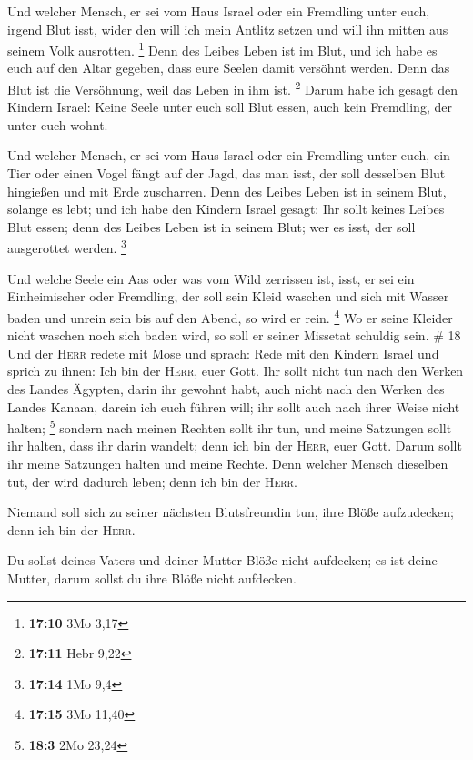  Und welcher Mensch, er sei vom Haus Israel oder ein
Fremdling unter euch, irgend Blut isst, wider den will ich mein Antlitz
setzen und will ihn mitten aus seinem Volk ausrotten. \footnote{\textbf{17:10}
  3Mo 3,17}  Denn des Leibes Leben ist im Blut, und ich
habe es euch auf den Altar gegeben, dass eure Seelen damit versöhnt
werden. Denn das Blut ist die Versöhnung, weil das Leben in ihm ist.
\footnote{\textbf{17:11} Hebr 9,22}  Darum habe ich
gesagt den Kindern Israel: Keine Seele unter euch soll Blut essen, auch
kein Fremdling, der unter euch wohnt.

 Und welcher Mensch, er sei vom Haus Israel oder ein
Fremdling unter euch, ein Tier oder einen Vogel fängt auf der Jagd, das
man isst, der soll desselben Blut hingießen und mit Erde zuscharren.
 Denn des Leibes Leben ist in seinem Blut, solange es
lebt; und ich habe den Kindern Israel gesagt: Ihr sollt keines Leibes
Blut essen; denn des Leibes Leben ist in seinem Blut; wer es isst, der
soll ausgerottet werden. \footnote{\textbf{17:14} 1Mo 9,4}

 Und welche Seele ein Aas oder was vom Wild zerrissen
ist, isst, er sei ein Einheimischer oder Fremdling, der soll sein Kleid
waschen und sich mit Wasser baden und unrein sein bis auf den Abend, so
wird er rein. \footnote{\textbf{17:15} 3Mo 11,40}  Wo er
seine Kleider nicht waschen noch sich baden wird, so soll er seiner
Missetat schuldig sein. \# 18  Und der \textsc{Herr}
redete mit Mose und sprach:  Rede mit den Kindern Israel
und sprich zu ihnen: Ich bin der \textsc{Herr}, euer Gott.
 Ihr sollt nicht tun nach den Werken des Landes Ägypten,
darin ihr gewohnt habt, auch nicht nach den Werken des Landes Kanaan,
darein ich euch führen will; ihr sollt auch nach ihrer Weise nicht
halten; \footnote{\textbf{18:3} 2Mo 23,24}  sondern nach
meinen Rechten sollt ihr tun, und meine Satzungen sollt ihr halten, dass
ihr darin wandelt; denn ich bin der \textsc{Herr}, euer Gott.
 Darum sollt ihr meine Satzungen halten und meine Rechte.
Denn welcher Mensch dieselben tut, der wird dadurch leben; denn ich bin
der \textsc{Herr}.

 Niemand soll sich zu seiner nächsten Blutsfreundin tun,
ihre Blöße aufzudecken; denn ich bin der \textsc{Herr}.

 Du sollst deines Vaters und deiner Mutter Blöße nicht
aufdecken; es ist deine Mutter, darum sollst du ihre Blöße nicht
aufdecken.

